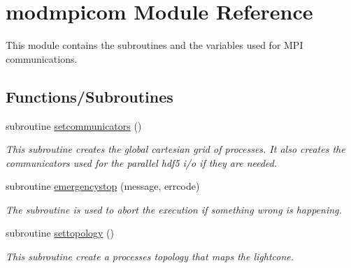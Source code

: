 \hypertarget{namespacemodmpicom}{}\section{modmpicom Module Reference}
\label{namespacemodmpicom}


This module contains the subroutines and the variables used for M\+PI communications.  


\subsection*{Functions/\+Subroutines}
\begin{DoxyCompactItemize}
\item 
subroutine \hyperlink{namespacemodmpicom_a95ff384e42736ca3e2ccef78d7d8554a}{setcommunicators} ()
\begin{DoxyCompactList}\small\item\em This subroutine creates the global cartesian grid of processes. It also creates the communicators used for the parallel hdf5 i/o if they are needed. \end{DoxyCompactList}\item 
subroutine \hyperlink{namespacemodmpicom_a75a2de7a16fce78b94bd79731a2fbd81}{emergencystop} (message, errcode)
\begin{DoxyCompactList}\small\item\em The subroutine is used to abort the execution if something wrong is happening. \end{DoxyCompactList}\item 
subroutine \hyperlink{namespacemodmpicom_a158a13b594a854025da3c47f32a493de}{settopology} ()
\begin{DoxyCompactList}\small\item\em This subroutine create a processes topology that maps the lightcone. \end{DoxyCompactList}\end{DoxyCompactItemize}
